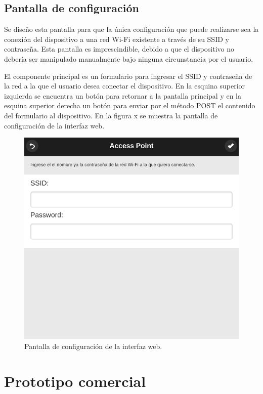 \subsection{Pantalla de configuración}

Se diseño esta pantalla para que la única configuración que puede realizarse sea la conexión del dispositivo a una red Wi-Fi existente a través de su SSID y contraseña. Esta pantalla es imprescindible, debido a que el dispositivo no debería ser manipulado manualmente bajo ninguna circunstancia por el usuario.

El componente principal es un formulario para ingresar el SSID y contraseña de la red a la que el usuario desea conectar el dispositivo. En la esquina superior izquierda se encuentra un botón para retornar a la pantalla principal y en la esquina superior derecha un botón para enviar por el método POST el contenido del formulario al dispositivo. En la figura x se muestra la pantalla de configuración de la interfaz web.

\begin{figure}[h]
	\centering
	\includegraphics[scale=0.5]{./Figures/interface_conf.png}
	\caption{Pantalla de configuración de la interfaz web.}
	\label{fig:blocksTest}
\end{figure}

\section{Prototipo comercial}

